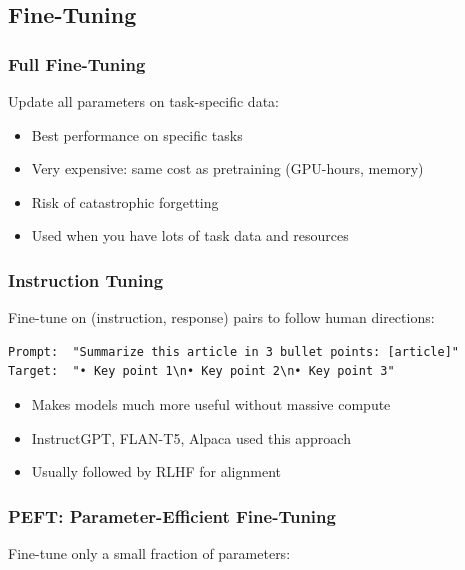 \documentclass[11pt]{article}
\providecommand{\tightlist}{\setlength{\itemsep}{1pt}\setlength{\parskip}{0pt}}
\begin{document}
\subsection{Fine-Tuning}\label{fine-tuning}

\subsubsection{Full Fine-Tuning}\label{full-fine-tuning}

Update all parameters on task-specific data:

\begin{itemize}
\tightlist
\item
  Best performance on specific tasks
\item
  Very expensive: same cost as pretraining (GPU-hours, memory)
\item
  Risk of catastrophic forgetting
\item
  Used when you have lots of task data and resources
\end{itemize}

\subsubsection{Instruction Tuning}\label{instruction-tuning}

Fine-tune on (instruction, response) pairs to follow human directions:

\setcodelang{}

\begin{verbatim}
Prompt:  "Summarize this article in 3 bullet points: [article]"
Target:  "• Key point 1\n• Key point 2\n• Key point 3"
\end{verbatim}

\begin{itemize}
\tightlist
\item
  Makes models much more useful without massive compute
\item
  InstructGPT, FLAN-T5, Alpaca used this approach
\item
  Usually followed by RLHF for alignment
\end{itemize}

\subsubsection{PEFT: Parameter-Efficient Fine-Tuning}\label{peft-parameter-efficient-fine-tuning}

Fine-tune only a small fraction of parameters:
\end{document}
